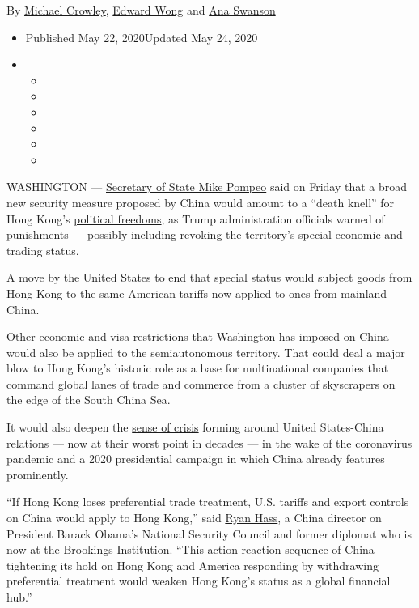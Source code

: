 By \href{https://www.nytimes3xbfgragh.onion/by/michael-crowley}{Michael
Crowley},
\href{https://www.nytimes3xbfgragh.onion/by/edward-wong}{Edward Wong}
and \href{https://www.nytimes3xbfgragh.onion/by/ana-swanson}{Ana
Swanson}

\begin{itemize}
\item
  Published May 22, 2020Updated May 24, 2020
\item
  \begin{itemize}
  \item
  \item
  \item
  \item
  \item
  \item
  \end{itemize}
\end{itemize}

WASHINGTON ---
\href{https://www.nytimes3xbfgragh.onion/2020/05/21/us/politics/mike-pompeo-inspector-general.html}{Secretary
of State Mike Pompeo} said on Friday that a broad new security measure
proposed by China would amount to a ``death knell'' for Hong Kong's
\href{https://www.nytimes3xbfgragh.onion/2019/11/14/business/hong-kong-protests-recession.html}{political
freedoms}, as Trump administration officials warned of punishments ---
possibly including revoking the territory's special economic and trading
status.

A move by the United States to end that special status would subject
goods from Hong Kong to the same American tariffs now applied to ones
from mainland China.

Other economic and visa restrictions that Washington has imposed on
China would also be applied to the semiautonomous territory. That could
deal a major blow to Hong Kong's historic role as a base for
multinational companies that command global lanes of trade and commerce
from a cluster of skyscrapers on the edge of the South China Sea.

It would also deepen the
\href{https://www.nytimes3xbfgragh.onion/2020/03/22/us/politics/coronavirus-us-china.html}{sense
of crisis} forming around United States-China relations --- now at their
\href{https://www.nytimes3xbfgragh.onion/2020/05/01/us/politics/coronavirus-china-trump.html}{worst
point in decades} --- in the wake of the coronavirus pandemic and a 2020
presidential campaign in which China already features prominently.

``If Hong Kong loses preferential trade treatment, U.S. tariffs and
export controls on China would apply to Hong Kong,'' said
\href{https://www.brookings.edu/experts/ryan-hass/}{Ryan Hass}, a China
director on President Barack Obama's National Security Council and
former diplomat who is now at the Brookings Institution. ``This
action-reaction sequence of China tightening its hold on Hong Kong and
America responding by withdrawing preferential treatment would weaken
Hong Kong's status as a global financial hub.''

